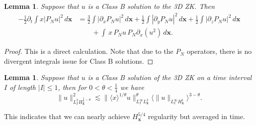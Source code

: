 \documentclass[12pt,letterpaper]{amsart}
\newcommand{\la}{\langle}
\newcommand{\ra}{\rangle}
\newtheorem{lemma}[theorem]{Lemma}
\theoremstyle{remark}
\numberwithin{equation}{section}
\numberwithin{theorem}{section}
\numberwithin{table}{section}
\begin{document}
\begin{lemma}
Suppose that $u$ is a Class B solution to the 3D ZK.  Then
\begin{equation}
\label{E:HR10}
\begin{aligned}
-\frac12\partial_t \int  x |P_Nu|^2 \, d\mathbf{x} 
&= \frac32 \int |\partial_x P_N u |^2 \, d\mathbf{x} + \frac12 \int |\partial_y P_N u |^2 \, d\mathbf{x}+ \frac12 \int |\partial_z P_N u |^2 \, d\mathbf{x} \\
& \qquad +  \int \, x \, P_N u \, P_N\partial_x (u^2) \, d\mathbf{x}.
\end{aligned}
\end{equation}
\end{lemma}

\begin{proof}
This is a direct calculation. Note that due to the $P_N$ operators, there is no divergent integrals issue for Class B solutions.
\end{proof}

\begin{lemma}
\label{L:L2boost}
Suppose that $u$ is a Class B solution of the 3D ZK on a time interval $I$ of length $|I|\leq 1$, then for $0<\theta<\frac14$ we have
\begin{equation}
\label{E:HR11}
\| u\|_{L_I^2H_{\mathbf{x}}^{\frac54-\theta}}^2 \lesssim \|\la x \ra^{1/\theta} u \|_{L_I^\infty L_{\mathbf{x}}^2}^\theta \la \| u \|_{L_I^\infty H_{\mathbf{x}}^1} \ra^{3-\theta}.
\end{equation}
\end{lemma}
This indicates that we can nearly achieve $H_{\mathbf{x}}^{5/4}$ regularity but averaged in time.
\end{document}
